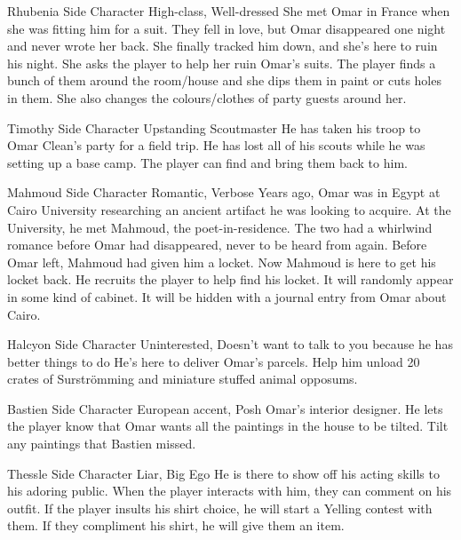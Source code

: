 {Rhubenia}
{Side Character}
{High-class, Well-dressed}
{She met Omar in France when she was fitting him for a suit. They fell in love, but Omar disappeared one night and never wrote her back. She finally tracked him down, and she's here to ruin his night.}
{She asks the player to help her ruin Omar's suits. The player finds a bunch of them around the room/house and she dips them in paint or cuts holes in them. She also changes the colours/clothes of party guests around her.}

{Timothy}
{Side Character}
{Upstanding Scoutmaster}
{He has taken his troop to Omar Clean's party for a field trip.}
{He has lost all of his scouts while he was setting up a base camp. The player can find and bring them back to him.}

{Mahmoud}
{Side Character}
{Romantic, Verbose}
{Years ago, Omar was in Egypt at Cairo University researching an ancient artifact he was looking to acquire. At the University, he met Mahmoud, the poet-in-residence. The two had a whirlwind romance before Omar had disappeared, never to be heard from again. Before Omar left, Mahmoud had given him a locket. Now Mahmoud is here to get his locket back.}
{He recruits the player to help find his locket. It will randomly appear in some kind of cabinet. It will be hidden with a journal entry from Omar about Cairo.}

{Halcyon}
{Side Character}
{Uninterested, Doesn't want to talk to you because he has better things to do}
{He's here to deliver Omar's parcels.}
{Help him unload 20 crates of Surstr\"{o}mming and miniature stuffed animal opposums.}

{Bastien}
{Side Character}
{European accent, Posh}
{Omar's interior designer.}
{He lets the player know that Omar wants all the paintings in the house to be tilted. Tilt any paintings that Bastien missed.}

{Thessle}
{Side Character}
{Liar, Big Ego}
{He is there to show off his acting skills to his adoring public.}
{When the player interacts with him, they can comment on his outfit. If the player insults his shirt choice, he will start a Yelling contest with them. If they compliment his shirt, he will give them an item.}